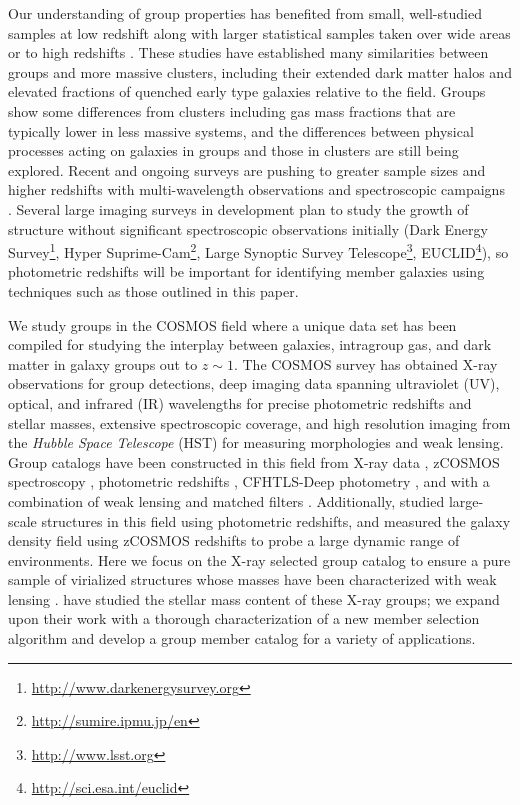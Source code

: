 Our understanding of group properties has benefited from small,
well-studied samples at low redshift \citep[e.g.,][]{Mulchaey1998, Zabludoff1998,
  Tran2001, Sun2009} along with larger statistical samples taken over wide
areas or to high redshifts \citep[e.g.,][]{Eke2004, Gerke2005,
  Gladders2005, Miller2005, Yang2005, Berlind2006,
  Hansen2009}. These studies have established many similarities
between groups and more massive clusters, including their extended
dark matter halos and elevated fractions of quenched early type
galaxies relative to the field. Groups show some differences from
clusters including gas mass fractions that are typically lower in less
massive systems, and the differences between physical processes acting on
galaxies in groups and those in clusters are still being explored.
Recent and ongoing surveys are pushing to greater 
sample sizes and higher redshifts with multi-wavelength observations and
spectroscopic campaigns \citep[e.g.,][]{Osmond2004, Driver2009,
  Milkeraitis2010, Adami2010}. Several large imaging surveys in
development plan to study the growth of structure without significant
spectroscopic observations initially (Dark Energy
Survey\footnote{\url{http://www.darkenergysurvey.org}}, Hyper
Suprime-Cam\footnote{\url{http://sumire.ipmu.jp/en}}, Large Synoptic
Survey Telescope\footnote{\url{http://www.lsst.org}},
EUCLID\footnote{\url{http://sci.esa.int/euclid}}), so photometric
redshifts will be important for identifying member galaxies using
techniques such as those outlined in this paper.

We study groups in the COSMOS field where a unique data set has been compiled for studying the
interplay between galaxies, intragroup gas, and dark matter in galaxy
groups out to $z\sim1$. The COSMOS survey has obtained X-ray observations for group detections, deep
imaging data spanning ultraviolet (UV), optical, and infrared (IR)
wavelengths for precise photometric redshifts and stellar masses,
extensive spectroscopic coverage, and high resolution imaging from the {\sl
  Hubble Space Telescope} (HST) for measuring morphologies and weak
lensing. Group catalogs have been  
constructed in this field from X-ray data \citep[][and in prep.]{Finoguenov2007},
zCOSMOS spectroscopy \citep{Knobel2009}, photometric redshifts
\citep{Gillis2011}, CFHTLS-Deep photometry
\citep{Olsen2007,Grove2009}, and with a combination of weak lensing
and matched filters \citep{Bellagamba2011}. Additionally,
\citet{Scoville2007b} studied large-scale structures in this field
using photometric redshifts, and \citet{Kovac2010a} measured the
galaxy density field using zCOSMOS redshifts to probe a large dynamic
range of environments. Here we focus on the X-ray selected group
catalog to ensure a pure sample of virialized structures whose masses
have been characterized with weak lensing \citep{Leauthaud2010}.
\citet{Giodini2009} have studied the stellar
mass content of these X-ray groups; we expand upon their work with a
thorough characterization of a new member selection algorithm and
develop a group member catalog for a variety of applications.

